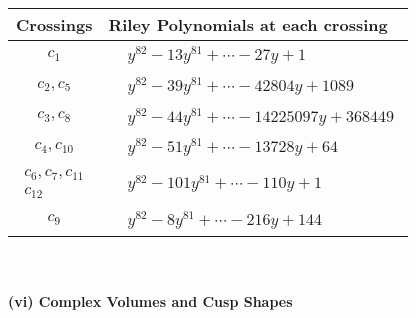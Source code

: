 \documentclass[1p]{elsarticle_modified}
\theoremstyle{definition}
\begin{document}
\begin{tabular}{m{50pt}|m{274pt}}
Crossings & \hspace{64pt}Riley Polynomials at each crossing \\
\hline $$\begin{aligned}c_{1}\end{aligned}$$&$\begin{aligned}
&y^{82}-13 y^{81}+\cdots-27 y+1
\end{aligned}$\\
\hline $$\begin{aligned}c_{2},c_{5}\end{aligned}$$&$\begin{aligned}
&y^{82}-39 y^{81}+\cdots-42804 y+1089
\end{aligned}$\\
\hline $$\begin{aligned}c_{3},c_{8}\end{aligned}$$&$\begin{aligned}
&y^{82}-44 y^{81}+\cdots-14225097 y+368449
\end{aligned}$\\
\hline $$\begin{aligned}c_{4},c_{10}\end{aligned}$$&$\begin{aligned}
&y^{82}-51 y^{81}+\cdots-13728 y+64
\end{aligned}$\\
\hline $$\begin{aligned}c_{6},c_{7},c_{11}\\c_{12}\end{aligned}$$&$\begin{aligned}
&y^{82}-101 y^{81}+\cdots-110 y+1
\end{aligned}$\\
\hline $$\begin{aligned}c_{9}\end{aligned}$$&$\begin{aligned}
&y^{82}-8 y^{81}+\cdots-216 y+144
\end{aligned}$\\
\hline
\end{tabular}\\~\\
\newpage\flushleft \textbf{(vi) Complex Volumes and Cusp Shapes}
\end{document}
